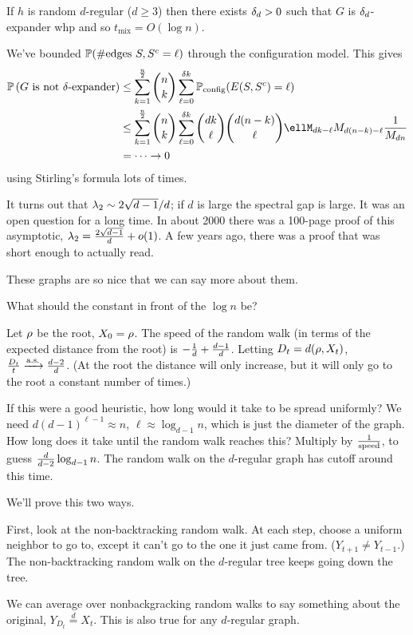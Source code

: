 \begin{thm}
If $h$ is random $d$-regular ($d\ge 3$) then there exists $\delta_d>0$ such that $G$ is $\delta_d$-expander whp  and so $t_{\text{mix}} = O(\log n)$.
\end{thm}
We've bounded $\mathbb{P}(\#\text{edges }S,S^c = \ell)$ through the configuration model. This gives
\begin{align}
\Pj\pat{$G$ is not $\de$-expander}
&\le \sumo k{\fc n2}\binom nk
\sumz{\ell}{\de k} \Pj_{\text{config}}(E(S,S^c)=\ell)\\
&\le \sumo k{\fc n2} \binom nk
\sumz{\ell}{\de k} \binom{dk}{\ell}
\binom{d(n-k)}{\ell}
\ell%
M_{dk-\ell} M_{d(n-k)-\ell}\rc{M_{dn}}\\
&=\cdots \to 0
\end{align}
using Stirling's formula lots of times.

It turns out that $\lambda_2\sim 2\sqrt{d-1}/d$; if $d$ is large the spectral gap is large. It was an open question for  a long time. In about 2000 there was a 100-page proof of this asymptotic, $\lambda_2=\frac{2\sqrt{d-1}}{d} + o(1)$. 
A few years ago, there was a proof that was short enough to actually read.

These graphs are so nice that we can say more about them.

What should the constant in front of the $\log n$ be?

Let $\rho$ be the root, $X_0=\rho$. 
The speed of the random walk (in terms of the expected distance from the root) is $-\frac{1}{d} + \frac{d-1}{d}$. Letting $D_t=d(\rho,X_t)$, $\frac{D_t}{t} \xrightarrow{\text{a.s.}} \frac{d-2}{d}$. (At the root the distance will only increase, but it will only go to the root a constant number of times.)

If this were a good heuristic, how long would it take to be spread uniformly? We need $d(d-1)^{\ell-1}\approx n$, $\ell\approx \log_{d-1}n$, which is just the diameter of the graph. How long does it take until the random walk reaches this? Multiply by $\frac{1}{\text{speed}}$, to guess $\frac{d}{d-2} \log_{d-1}n$. The random walk on the $d$-regular graph has cutoff around this time.

We'll prove this two ways.

First, look at the non-backtracking random walk. At each step, choose a uniform neighbor to go to, except it can't go to the one it just came from. ($Y_{t+1}\ne Y_{t-1}$.) The non-backtracking random walk on the $d$-regular tree keeps going down the tree.

We can average over nonbackgracking random walks to say something about the original, $Y_{D_t}\stackrel d= X_t$. This is also true for any $d$-regular graph. 

